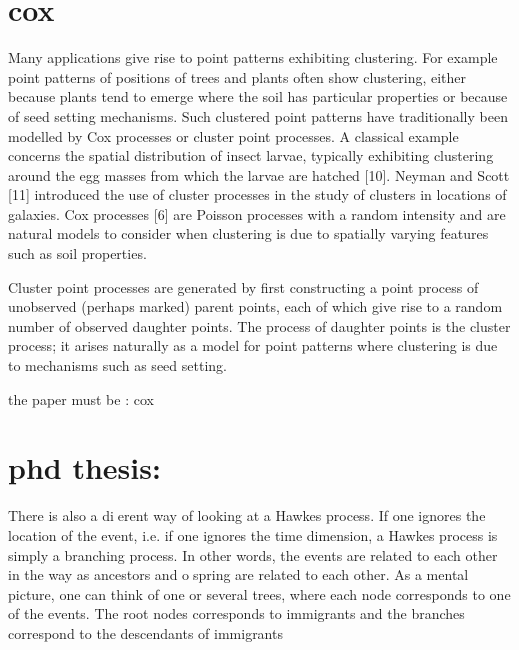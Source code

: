 \documentclass[11pt]{book}
\begin{document}
\frontmatter
\pagestyle{front}

\mainmatter
\pagestyle{main}

\section{cox}
Many applications give rise to point patterns exhibiting clustering. For example point patterns of positions of trees and plants often show clustering, either because plants tend to emerge where the soil has particular properties or because of seed setting mechanisms. Such clustered point patterns have traditionally been modelled by Cox processes or cluster point processes. A classical example concerns the spatial distribution of insect larvae, typically exhibiting clustering around the egg masses from which the larvae are hatched [10]. Neyman and Scott [11] introduced the use of cluster processes in the study of clusters in locations of galaxies. Cox processes [6] are Poisson processes with a random intensity and are natural models to consider when clustering is due to spatially varying features such as soil properties. 

Cluster point processes are generated by first constructing a point process of unobserved (perhaps marked) parent points, each of which give rise to a random number of observed daughter points. The process of daughter points is the cluster process; it arises naturally as a model for point patterns where clustering is due to mechanisms such as seed setting.

the paper must be : cox







\section{phd thesis:}
There is also a dierent way of looking
at a Hawkes process. If one ignores the location of the event, i.e. if one ignores
the time dimension, a Hawkes process is simply a branching process. In other
words, the events are related to each other in the way as ancestors and ospring
are related to each other. As a mental picture, one can think of one or several
trees, where each node corresponds to one of the events. The root nodes
corresponds to immigrants and the branches correspond to the descendants of
immigrants
\end{document}
